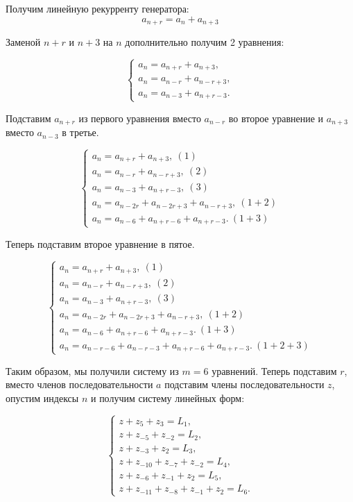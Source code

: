Получим линейную рекурренту генератора:
$$a_{n+r} = a_n + a_{n+3}$$

Заменой $n+r$ и $n+3$ на $n$ дополнительно получим 2 уравнения:

\begin{equation*}
\begin{cases}
a_n = a_{n+r} + a_{n+3}, \\
a_n = a_{n-r} + a_{n-r+3}, \\
a_n = a_{n-3} + a_{n+r-3}.
\end{cases}
\end{equation*}

Подставим $a_{n+r}$ из первого уравнения вместо $a_{n-r}$ во второе уравнение и $a_{n+3}$ вместо $a_{n-3}$ в третье.

\begin{equation*}
\begin{cases}
a_n = a_{n+r} + a_{n+3},\ (1) \\
a_n = a_{n-r} + a_{n-r+3},\ (2) \\
a_n = a_{n-3} + a_{n+r-3},\ (3) \\
a_n = a_{n-2r} + a_{n-2r+3} + a_{n-r+3},\ (1+2) \\
a_n = a_{n-6} + a_{n+r-6} + a_{n+r-3}.\ (1+3)
\end{cases}
\end{equation*}

Теперь подставим второе уравнение в пятое.

\begin{equation*}
\begin{cases}
a_n = a_{n+r} + a_{n+3},\ (1) \\
a_n = a_{n-r} + a_{n-r+3},\ (2) \\
a_n = a_{n-3} + a_{n+r-3},\ (3) \\
a_n = a_{n-2r} + a_{n-2r+3} + a_{n-r+3},\ (1+2) \\
a_n = a_{n-6} + a_{n+r-6} + a_{n+r-3}.\ (1+3) \\
a_n = a_{n-r-6} + a_{n-r-3} + a_{n+r-6} + a_{n+r-3}.\ (1+2+3)
\end{cases}
\end{equation*}

Таким образом, мы получили систему из $m=6$ уравнений. Теперь подставим $r$, вместо членов последовательности $a$ подставим члены последовательности $z$, опустим индексы $n$ и получим систему линейных форм:

\begin{equation*}
\begin{cases}
z + z_{5} + z_{3} = L_1, \\
z + z_{-5} + z_{-2} = L_2, \\
z + z_{-3} + z_{2} = L_3, \\
z + z_{-10} + z_{-7} + z_{-2} = L_4, \\
z + z_{-6} + z_{-1} + z_{2} = L_5, \\
z + z_{-11} + z_{-8} + z_{-1} + z_{2} = L_6.
\end{cases}
\end{equation*}


